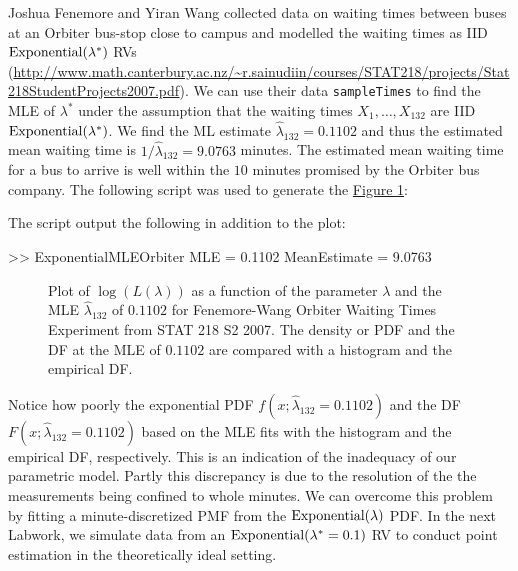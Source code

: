\begin{labwork}\label{LW:ExponentialMLEOrbiter}
Joshua Fenemore and Yiran Wang collected data on waiting times between buses at an Orbiter bus-stop close to campus and modelled the waiting times as IID $\mbox{{\rm Exponential}}(\lambda^*)$ RVs (\href{http://www.math.canterbury.ac.nz/~r.sainudiin/courses/STAT218/projects/Stat218StudentProjects2007.pdf}{\url{http://www.math.canterbury.ac.nz/~r.sainudiin/courses/STAT218/projects/Stat218StudentProjects2007.pdf}}).  We can use their data {\tt sampleTimes} to find the MLE of $\lambda^*$ under the assumption that the waiting times $X_1,\ldots,X_{132}$ are IID $\mbox{{\rm Exponential}}(\lambda^*)$.  We find the ML estimate $\widehat{\lambda}_{132}=0.1102$ and thus the estimated mean waiting time is $1/\widehat{\lambda}_{132}=9.0763$ minutes.  The estimated mean waiting time for a bus to arrive is well within the $10$ minutes promised by the Orbiter bus company.  The following script was used to generate the \hyperref[F:ExponentialMLE]{Figure \ref*{F:ExponentialMLEOrbiter}}:


The script output the following in addition to the plot:
\begin{VrbM}
>> ExponentialMLEOrbiter
MLE =    0.1102
MeanEstimate =    9.0763
\end{VrbM}
\end{labwork}

\begin{figure}[htpb]
\caption{Plot of $\log(L(\lambda))$ as a function of the parameter $\lambda$  and the MLE $\widehat{\lambda}_{132}$ of $0.1102$ for Fenemore-Wang Orbiter Waiting Times Experiment from STAT 218 S2 2007.  The density or PDF and the DF at the MLE of $0.1102$ are compared with a histogram and the empirical DF.\label{F:ExponentialMLEOrbiter}}
\centering   {}
\end{figure}
Notice how poorly the exponential PDF $f(x;\widehat{\lambda}_{132}=0.1102)$ and the DF $F(x;\widehat{\lambda}_{132}=0.1102)$ based on the MLE fits with the histogram and the empirical DF, respectively.  This is an indication of the inadequacy of our parametric model.  Partly this discrepancy is due to the resolution of the the measurements being confined to whole minutes.  We can overcome this problem by fitting a minute-discretized PMF from the $\mbox{{\rm Exponential}}(\lambda)$ PDF.  In the next Labwork, we simulate data from an $\mbox{{\rm Exponential}}(\lambda^*=0.1)$ RV to conduct point estimation in the theoretically ideal setting. 

